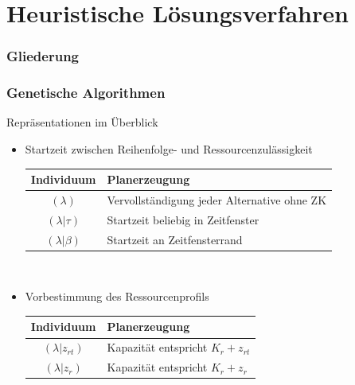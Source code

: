 
\section{Heuristische Lösungsverfahren}

\begin{frame}[noframenumbering]
\frametitle{Gliederung}
\end{frame}

\begin{frame}
\frametitle{Genetische Algorithmen}
Repräsentationen im Überblick
\begin{itemize}
	\item \small{Startzeit zwischen Reihenfolge- und Ressourcenzulässigkeit}\\[2mm]
	\begin{small}
	\begin{tabular}{cp{7.5cm}}
	\hline
	Individuum & Planerzeugung\\
	\hline
	$(\lambda)$ & Vervollständigung jeder Alternative ohne ZK\\	
	$(\lambda|\tau)$& Startzeit beliebig in Zeitfenster\\
	$(\lambda|\beta)$& Startzeit an Zeitfensterrand\\
	\end{tabular}
	\end{small}\\[4mm]
	
	\item \small{Vorbestimmung des Ressourcenprofils}\\[2mm]
	\begin{small}
		\begin{tabular}{cp{7.5cm}}
			\hline
			Individuum & Planerzeugung\\
			\hline
			$(\lambda|z_{rt})$ & Kapazität entspricht $K_r+z_{rt}$\\
			$(\lambda|z_r)$ & Kapazität entspricht $K_r+z_{r}$\\
		\end{tabular}
	\end{small}
\end{itemize}
\end{frame}


